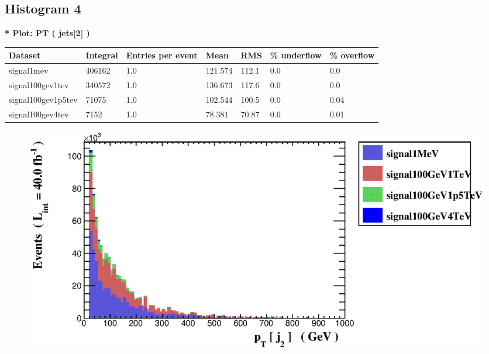 \documentclass[a4paper, 10pt]{article}
\begin{document}
\subsection{ Histogram 4}

\textbf{* Plot: PT ( jets[2] ) }\\
   \begin{table}[H]
  \begin{center}
    \begin{tabular}{|m{23.0mm}|m{23.0mm}|m{18.0mm}|m{19.0mm}|m{19.0mm}|m{19.0mm}|m{19.0mm}|}
      \hline
      {\cellcolor{yellow}         Dataset}& {\cellcolor{yellow}         Integral}& {\cellcolor{yellow}         Entries per event}& {\cellcolor{yellow}         Mean}& {\cellcolor{yellow}         RMS}& {\cellcolor{yellow}         \% underflow}& {\cellcolor{yellow}         \% overflow}\\
      \hline
      {\cellcolor{white}         signal1mev}& {\cellcolor{white}         406162}& {\cellcolor{white}         1.0}& {\cellcolor{white}         121.574}& {\cellcolor{white}         112.1}& {\cellcolor{green}         0.0}& {\cellcolor{green}         0.0}\\
      \hline
      {\cellcolor{white}         signal100gev1tev}& {\cellcolor{white}         340572}& {\cellcolor{white}         1.0}& {\cellcolor{white}         136.673}& {\cellcolor{white}         117.6}& {\cellcolor{green}         0.0}& {\cellcolor{green}         0.0}\\
      \hline
      {\cellcolor{white}         signal100gev1p5tev}& {\cellcolor{white}         71075}& {\cellcolor{white}         1.0}& {\cellcolor{white}         102.544}& {\cellcolor{white}         100.5}& {\cellcolor{green}         0.0}& {\cellcolor{green}         0.04}\\
      \hline
      {\cellcolor{white}         signal100gev4tev}& {\cellcolor{white}         7152}& {\cellcolor{white}         1.0}& {\cellcolor{white}         78.381}& {\cellcolor{white}         70.87}& {\cellcolor{green}         0.0}& {\cellcolor{green}         0.01}\\
\hline
    \end{tabular}
  \end{center}
\end{table}

\begin{figure}[H]
  \begin{center}
    \includegraphics[scale=0.45]{selection_3.eps}\\
\caption{   }
  \end{center}
\end{figure}
      \newpage
\end{document}
